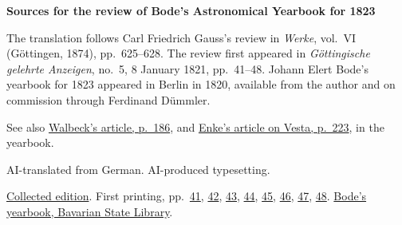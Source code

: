 \clearpage\thispagestyle{empty}
\begin{center}\Large\bfseries Sources for the review of Bode’s Astronomical Yearbook for 1823\end{center}

The translation follows Carl Friedrich Gauss’s review in \emph{Werke}, vol.~VI (Göttingen, 1874), pp.~625--628. The review first appeared in \emph{Göttingische gelehrte Anzeigen}, no.~5, 8 January 1821, pp.~41--48. Johann Elert Bode’s yearbook for 1823 appeared in Berlin in 1820, available from the author and on commission through Ferdinand Dümmler.

See also \href{https://api.digitale-sammlungen.de/iiif/image/v2/bsb10538352_00192/full/1650,/0/default.jpg}{Walbeck’s article, p.~186}, and \href{https://api.digitale-sammlungen.de/iiif/image/v2/bsb10538352_00229/full/1650,/0/default.jpg}{Enke’s article on Vesta, p.~223}, in the yearbook.

AI-translated from German. AI-produced typesetting.

\href{https://gdz.sub.uni-goettingen.de/id/PPN236007467}{Collected edition}. First printing, pp.~\href{https://images.p.sub.uni-goettingen.de/iiif/image/gdz:PPN319721507_1821:00000043/full/1650,/0/default.jpg}{41}, \href{https://images.p.sub.uni-goettingen.de/iiif/image/gdz:PPN319721507_1821:00000044/full/1650,/0/default.jpg}{42}, \href{https://images.p.sub.uni-goettingen.de/iiif/image/gdz:PPN319721507_1821:00000045/full/1650,/0/default.jpg}{43}, \href{https://images.p.sub.uni-goettingen.de/iiif/image/gdz:PPN319721507_1821:00000046/full/1650,/0/default.jpg}{44}, \href{https://images.p.sub.uni-goettingen.de/iiif/image/gdz:PPN319721507_1821:00000047/full/1650,/0/default.jpg}{45}, \href{https://images.p.sub.uni-goettingen.de/iiif/image/gdz:PPN319721507_1821:00000048/full/1650,/0/default.jpg}{46}, \href{https://images.p.sub.uni-goettingen.de/iiif/image/gdz:PPN319721507_1821:00000049/full/1650,/0/default.jpg}{47}, \href{https://images.p.sub.uni-goettingen.de/iiif/image/gdz:PPN319721507_1821:00000050/full/1650,/0/default.jpg}{48}. \href{https://api.digitale-sammlungen.de/iiif/image/v2/bsb10538352_00003/full/1650,/0/default.jpg}{Bode’s yearbook, Bavarian State Library}.

\clearpage
